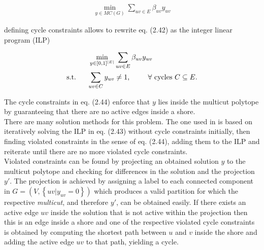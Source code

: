 \begin{align}
	\min_{y \in MC(G)} \sum_{uv \in E} \beta_{uv} y_{uv}
\end{align}

defining cycle constraints allows to rewrite eq. (2.42) as the integer linear program (ILP)

\begin{align}
	\min_{y \in [0, 1]^{|E|}} & \sum_{uv \in E} \beta_{uv} y_{uv} \\
	 \text{s.t. \hspace{4mm}} \sum_{uv \in C} y_{uv} & \neq 1 \text{, \hspace{8mm}} \forall \text{ cycles } C \subseteq E .
\end{align}

The cycle constraints in eq. (2.44) enforce that $y$ lies inside the multicut polytope by guaranteeing that there are no active edges inside a shore.\\
There are many solution methods for this problem. The one used in \cite{10.1007/978-3-642-23094-3_3} is based on iteratively solving the ILP in eq. (2.43) without cycle constraints initially, then finding violated constraints in the sense of eq. (2.44), adding them to the ILP and reiterate until there are no more violated cycle constraints.\\
Violated constraints can be found by projecting an obtained solution $y$ to the multicut polytope and checking for differences in the solution and the projection $y'$.
The projection is achieved by assigning a label to each connected component in $G=(V, \left\{ uv | y_{uv} = 0 \right\})$ which produces a valid partition for which the respective \emph{multicut}, and therefore $y'$, can be obtained easily. If there exists an active edge $uv$ inside the solution that is not active within the projection then this is an edge inside a shore and one of the respective violated cycle constraints is obtained by computing the shortest path between $u$ and $v$ inside the shore and adding the active edge $uv$ to that path, yielding a cycle.
